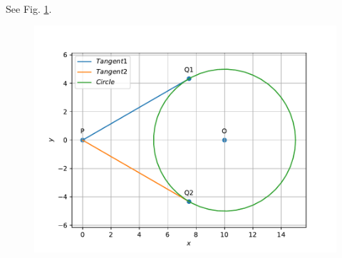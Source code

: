 	\\
	\solution See Fig. 
		\ref{fig:10/11/2/4}.
	\begin{figure}[!ht]
		\centering
 \includegraphics[width=\columnwidth]{chapters/10/11/2/4/figs/circle1.pdf}
		\caption{}
		\label{fig:10/11/2/4}
  	\end{figure}

